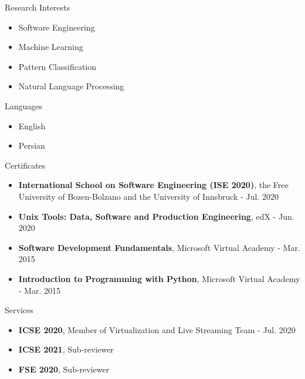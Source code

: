 \documentclass{resume} %
\begin{document}
\begin{paracol}{2}
\begin{rSection}{Research Interests}
	
	\begin{itemize}
		\item Software Engineering
		\item Machine Learning
		\item Pattern Classification
		\item Natural Language Processing
	\end{itemize}
	
\end{rSection}
\switchcolumn
\begin{rSection}{Languages}
	
	\begin{itemize}
		\item English
		\item Persian 
	\end{itemize}
	
\end{rSection}
\end{paracol}

\begin{rSection}{Certificates}
	
	\begin{itemize}
		\item \textbf{International School on Software Engineering (ISE 2020)}, the Free University of Bozen-Bolzano
         and the University of Innsbruck - Jul. 2020
		\item \textbf{Unix Tools: Data, Software and Production Engineering}, edX - Jun. 2020
		\item \textbf{Software Development Fundamentals}, Microsoft Virtual Academy - Mar. 2015
		\item \textbf{Introduction to Programming with Python}, Microsoft Virtual Academy - Mar. 2015
	\end{itemize}
	
\end{rSection}

\begin{rSection}{Services}
	
	\begin{itemize}
		\item \textbf{ICSE 2020}, Member of Virtualization and Live Streaming Team - Jul. 2020
		\item \textbf{ICSE 2021}, Sub-reviewer
		\item \textbf{FSE 2020}, Sub-reviewer
	\end{itemize}
	
\end{rSection}
\end{document}
